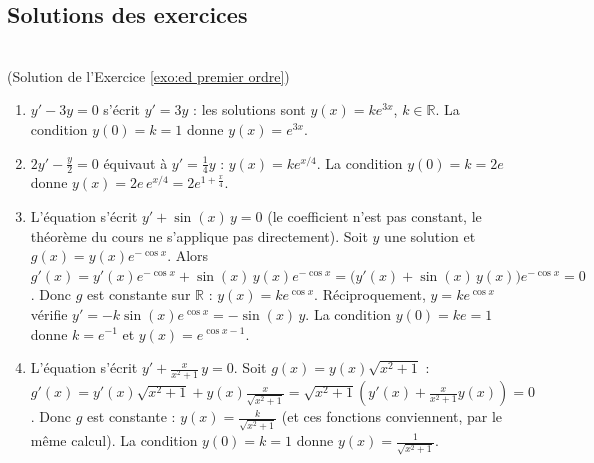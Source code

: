 \begin{corrige}
\section{Solutions des exercices}
\begin{sol} ~ \\
(Solution de l'Exercice \ref{exo:ed premier ordre})
\begin{enumerate}
\item $y' - 3y = 0$ s'\'ecrit $y' = 3y$ : les solutions sont $y(x) = k e^{3x}$, $k \in \mathbb{R}$.
      La condition $y(0) = k = 1$ donne $\boxed{y(x) = e^{3x}}$.
\item $2y' - \frac{y}{2} = 0$ \'equivaut \`a $y' = \frac{1}{4} y$ : $y(x) = k e^{x/4}$.
      La condition $y(0) = k = 2e$ donne $\boxed{y(x) = 2e \, e^{x/4} = 2 e^{1 + \frac{x}{4}}}$.
\item L'\'equation s'\'ecrit $y' + \sin(x)\, y = 0$ (le coefficient n'est pas constant, le th\'eor\`eme du cours ne s'applique pas directement).
      Soit $y$ une solution et $g(x) = y(x) e^{-\cos x}$. Alors
      $g'(x) = y'(x) e^{-\cos x} + \sin(x)\, y(x) e^{-\cos x} = \big(y'(x) + \sin(x)\, y(x)\big) e^{-\cos x} = 0$.
      Donc $g$ est constante sur $\mathbb{R}$ : $y(x) = k e^{\cos x}$. R\'eciproquement,
      $y = k e^{\cos x}$ v\'erifie $y' = -k \sin(x) e^{\cos x} = -\sin(x)\, y$.
      La condition $y(0) = k e = 1$ donne $k = e^{-1}$ et $\boxed{y(x) = e^{\cos x - 1}}$.
\item L'\'equation s'\'ecrit $y' + \frac{x}{x^2+1}\, y = 0$. Soit $g(x) = y(x)\sqrt{x^2+1}$ :
      $g'(x) = y'(x)\sqrt{x^2+1} + y(x)\frac{x}{\sqrt{x^2+1}} = \sqrt{x^2+1}\left(y'(x) + \frac{x}{x^2+1} y(x)\right) = 0$.
      Donc $g$ est constante : $y(x) = \frac{k}{\sqrt{x^2+1}}$ (et ces fonctions conviennent, par le m\^eme calcul).
      La condition $y(0) = k = 1$ donne $\boxed{y(x) = \frac{1}{\sqrt{x^2+1}}}$.
\end{enumerate}
\end{sol}


\end{corrige}
